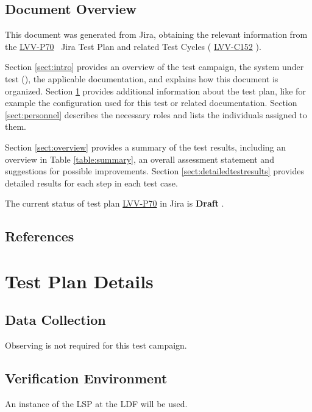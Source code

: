 \documentclass[DM,lsstdraft,STR,toc]{lsstdoc}
\begin{document}
\subsection{Document Overview}
\label{sect:docoverview}

This document was generated from Jira, obtaining the relevant information from the
\href{https://jira.lsstcorp.org/secure/Tests.jspa\#/testPlan/LVV-P70}{LVV-P70}
~Jira Test Plan and related Test Cycles (
\href{https://jira.lsstcorp.org/secure/Tests.jspa\#/testCycle/LVV-C152}{LVV-C152}
).

Section \ref{sect:intro} provides an overview of the test campaign, the system under test (\product{}),
the applicable documentation, and explains how this document is organized.
Section \ref{sect:testplan} provides additional information about the test plan, like for example the configuration
used for this test or related documentation.
Section \ref{sect:personnel} describes the necessary roles and lists the individuals assigned to them.

Section \ref{sect:overview} provides a summary of the test results, including an overview in Table \ref{table:summary},
an overall assessment statement and suggestions for possible improvements.
Section \ref{sect:detailedtestresults} provides detailed results for each step in each test case.

The current status of test plan \href{https://jira.lsstcorp.org/secure/Tests.jspa\#/testPlan/LVV-P70}{LVV-P70} in Jira is \textbf{ Draft }.

\subsection{References}
\label{sect:references}
\renewcommand{\refname}{}



\newpage
\section{Test Plan Details}
\label{sect:testplan}


\subsection{Data Collection}

  Observing is not required for this test campaign.

\subsection{Verification Environment}
\label{sect:hwconf}
  An instance of the LSP at the LDF will be used.
\end{document}
